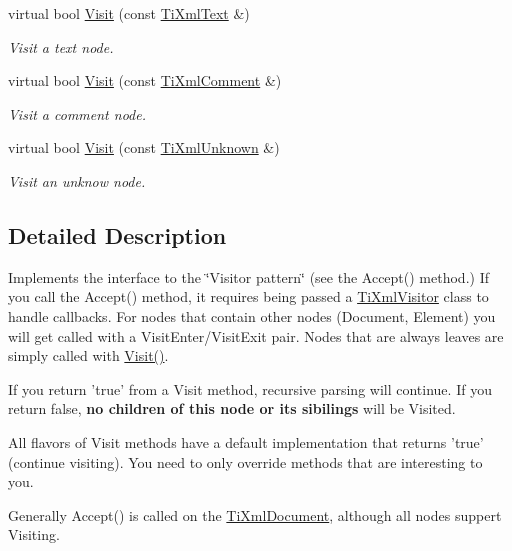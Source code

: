 \begin{DoxyCompactItemize}
virtual bool \hyperlink{classTiXmlVisitor_a399b8ebca5cd14664974a32d2ce029e5}{Visit} (const \hyperlink{classTiXmlText}{TiXmlText} \&)
\begin{DoxyCompactList}\small\item\em Visit a text node. \item\end{DoxyCompactList}\item 
virtual bool \hyperlink{classTiXmlVisitor_a53a60e7a528627b31af3161972cc7fa2}{Visit} (const \hyperlink{classTiXmlComment}{TiXmlComment} \&)
\begin{DoxyCompactList}\small\item\em Visit a comment node. \item\end{DoxyCompactList}\item 
virtual bool \hyperlink{classTiXmlVisitor_a7e284d607d275c51dac1adb58159ce28}{Visit} (const \hyperlink{classTiXmlUnknown}{TiXmlUnknown} \&)
\begin{DoxyCompactList}\small\item\em Visit an unknow node. \item\end{DoxyCompactList}\end{DoxyCompactItemize}


\subsection{Detailed Description}
Implements the interface to the \char`\"{}Visitor pattern\char`\"{} (see the Accept() method.) If you call the Accept() method, it requires being passed a \hyperlink{classTiXmlVisitor}{TiXmlVisitor} class to handle callbacks. For nodes that contain other nodes (Document, Element) you will get called with a VisitEnter/VisitExit pair. Nodes that are always leaves are simply called with \hyperlink{classTiXmlVisitor_afad71c71ce6473fb9b4b64cd92de4a19}{Visit()}.

If you return 'true' from a Visit method, recursive parsing will continue. If you return false, {\bfseries no children of this node or its sibilings} will be Visited.

All flavors of Visit methods have a default implementation that returns 'true' (continue visiting). You need to only override methods that are interesting to you.

Generally Accept() is called on the \hyperlink{classTiXmlDocument}{TiXmlDocument}, although all nodes suppert Visiting.


